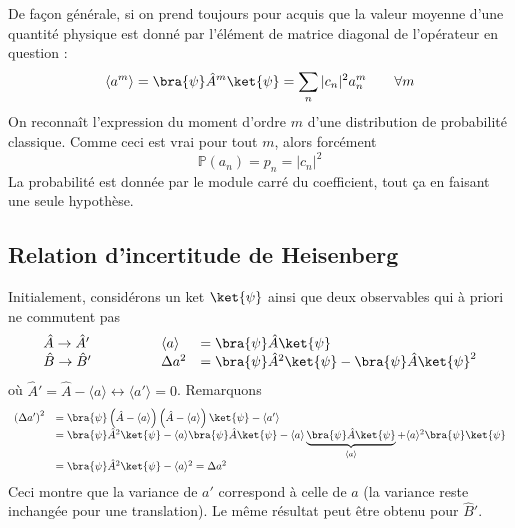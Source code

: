  De façon générale, si on prend toujours pour acquis que la valeur moyenne 
 d'une quantité physique est donné par l'élément de matrice diagonal 
 de l'opérateur en question :
 \begin{equation}
 \langle a^m\rangle = \bra{\psi}\hat{A}^m\ket{\psi} = \sum_n |c_n|^2 a_n^m\qquad
  \forall m
 \end{equation}
 On reconnaît l'expression du moment d'ordre $m$ d'une distribution de probabilité 
 classique. Comme ceci est vrai pour tout $m$, alors forcément
 \begin{equation}
 \mathbb{P}(a_n) = p_n = |c_n|^2
 \end{equation}
 La probabilité est donnée par le module carré du coefficient, tout ça 
 en faisant une seule hypothèse.
  
 \subsection{Relation d'incertitude de Heisenberg}
 Initialement, considérons un ket $\ket{\psi}$ ainsi que deux observables qui 
 à priori ne commutent pas
 \begin{equation}
 \begin{array}{lll}
 \hat{A}\rightarrow\hat{A}'\qquad\qquad &\langle a\rangle &= \bra{\psi}\hat{A}\ket{\psi}\\
 \hat{B}\rightarrow\hat{B}'\qquad\qquad &\Delta a^2 &= \bra{\psi}\hat{A}^2\ket{\psi}
 -\bra{\psi}\hat{A}\ket{\psi}^2
 \end{array}
 \end{equation}
 où $\hat{A}' = \hat{A}-\langle a\rangle \leftrightarrow \langle a'\rangle=0$. Remarquons 
 \begin{equation}
 \begin{array}{ll}
 \left(\Delta a'\right)^2 &= \bra{\psi}\left(\hat{A}-\langle a\rangle\right)
 \left(\hat{A}-\langle a\rangle\right)\ket{\psi} -\langle a'\rangle\\
 &= \bra{\psi}\hat{A}^2\ket{\psi} - \langle a\rangle\bra{\psi}\hat{A}\ket{\psi}-\langle a
 \rangle\underbrace{\bra{\psi}\hat{A}\ket{\psi}}_{\langle a\rangle} + \langle a\rangle^2\bra{\psi}\ket{\psi}\\
 &= \bra{\psi}\hat{A}^2\ket{\psi} - \langle a\rangle^2 = \Delta a^2
 \end{array}
 \end{equation}
 Ceci montre que la variance de $a'$ correspond à celle de $a$ (la variance reste 
 inchangée pour une translation). Le même résultat peut être obtenu pour $\hat{B}'$.\\
 
